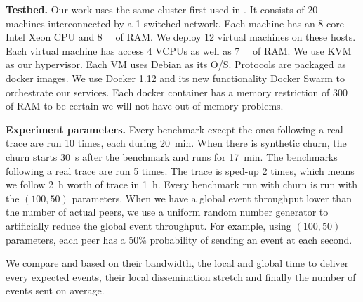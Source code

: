 \par
\textbf{Testbed.} Our work uses the same cluster first used in \autocite{vaucher2016erasure}. It consists of 20 machines interconnected by a \SI{1}{\gbps} switched network. Each machine has an 8-core Intel Xeon CPU and \SI{8}{\giga\byte} of RAM. We deploy 12 virtual machines on these hosts. Each virtual machine has access 4 VCPUs as well as \SI{7}{\giga\byte} of RAM. We use KVM as our hypervisor. Each VM uses Debian as its O/S. Protocols are packaged as docker images. We use Docker 1.12 and its new functionality Docker Swarm to orchestrate our services. Each docker container has a memory restriction of \SI{300}{\mega\byte} of RAM to be certain we will not have out of memory problems.
\par
\textbf{Experiment parameters.} Every benchmark except the ones following a real trace are run 10 times, each during \SI{20}{\minute}. When there is synthetic churn, the churn starts \SI{30}{\second} after the benchmark and runs for \SI{17}{\minute}. The benchmarks following a real trace are run 5 times. The trace is sped-up 2 times, which means we follow \SI{2}{\hour} worth of trace in \SI{1}{\hour}. Every benchmark run with churn is run with the $(100,50)$ parameters. When we have a global event throughput lower than the number of actual peers, we use a uniform random number generator to artificially reduce the global event throughput. For example, using $(100,50)$ parameters, each peer has a 50\% probability of sending an event at each second.
\par
We compare \epto and \jgroups based on their bandwidth, the local and global time to deliver every expected events, their local dissemination stretch and finally the number of events sent on average.
